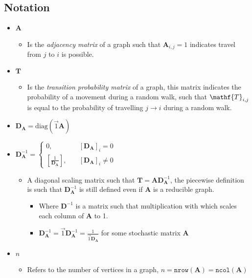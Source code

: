 \documentclass[11pt]{article}
\begin{document}
\subsection{Notation}
\label{notation}
\begin{itemize}
\item \(\mathbf{A}\)
\begin{itemize}
\item Is the \emph{adjacency matrix} of a graph such that \(\mathbf{A}_{i,j} = 1\) indicates travel from \(j\) to \(i\) is possible.
\end{itemize}
\item \(\mathbf{T}\)
\begin{itemize}
\item Is the \emph{transition probability matrix} of a graph, this matrix indicates the probability of a movement during a random walk, such that \(\mathf{T}_{i,j}\) is equal to the probability of travelling \(j \rightarrow  i\) during a random walk.
\end{itemize}
\item \(\mathbf{D}_{\mathbf{A}}=\mathrm{diag}\left(\vec{1}\mathbf{A}\right)\)
\item \(\mathbf{D}_{\mathbf{A}}^{- 1}  =
   \begin{cases}
   0 ,& \quad \left[ \mathbf{D}_{\mathbf{A}} \right]_i = 0 \\
   \left[ \frac{1}{\mathbf{D}_{\mathbf{A}}} \right] ,& \enspace \enspace \left[ \mathbf{D}_{\mathbf{A}} \right]_i \neq 0
   \end{cases}\)
\begin{itemize}
\item A diagonal scaling matrix such that \(\mathbf{T} = \mathbf{A} \mathbf{D}_{\mathbf{A}}^{-1}\), the piecewise definition is such that \(\mathbf{D}^{-1}_{\mathbf{A}}\) is still defined even if \(\mathbf{A}\) is a reducible graph.
\begin{itemize}
\item Where \(\mathbf{D}^{-1}\) is a matrix such that multiplication with which scales each column of \(\mathbf{A}\) to 1.
\item \(\mathbf{D}^{-1}_{\mathbf{A}} = \vec{1}\mathbf{D}^{-1}_{\mathbf{A}} = \frac{1}{\vec{1}\mathbf{D}_{\mathbf{A}}}\) for some stochastic matrix \(\mathbf{A}\)
\end{itemize}
\end{itemize}
\item \(n\)
\begin{itemize}
\item Refers to the number of vertices in a graph, \(n = \mathtt{nrow}\left(\mathbf{A}\right) = \mathtt{ncol}\left(\mathbf{A}\right)\)

\end{itemize}
\end{itemize}
\end{document}
